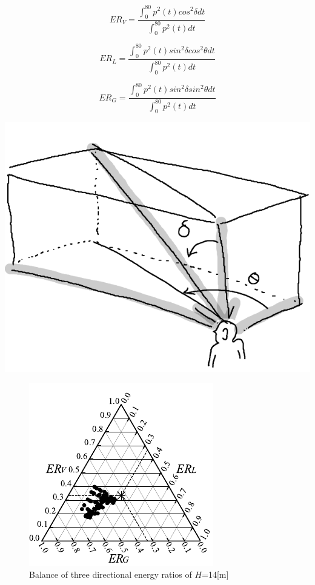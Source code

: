 \begin{table}[htbp]
\begin{equation}
  \label{eq:ERV}
  ER_V = {\frac{\displaystyle\int_0^{80}p^2(t)cos^2{\delta}dt}{\displaystyle\int_0^{80}p^2(t)dt}} 
\end{equation}

\begin{equation}
  \label{eq:ERL}
  ER_L = {\frac{\displaystyle\int_0^{80}p^2(t)sin^2{\delta}cos^2{\theta}dt}{\displaystyle\int_0^{80}p^2(t)dt}} 
\end{equation}

\begin{equation}
  \label{eq:ERG}
  ER_G = {\frac{\displaystyle\int_0^{80}p^2(t)sin^2{\delta}sin^2{\theta}dt}{\displaystyle\int_0^{80}p^2(t)dt}} 
\end{equation}

\centering
\includegraphics[keepaspectratio,scale=1]{04_att/direction.png}
\label{fig:}
\end{table}

\newpage

\begin{figure}[htbp]
    \centering
    \includegraphics[keepaspectratio,scale=1.2]{05_att/rec_Ternary_out_14m.pdf}
    \caption{\hspace{1mm}Balance of three directional energy ratios of $H$=14[m]}
    \label{fig:sankaku14}
\end{figure}

